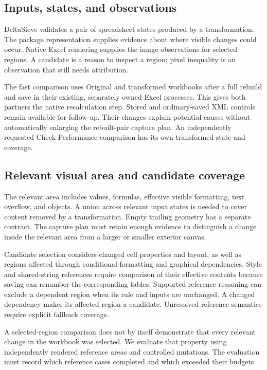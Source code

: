 \subsection{Inputs, states, and observations}
DeltaSieve validates a pair of spreadsheet states produced by a transformation.
The package representation supplies evidence about where visible changes could
occur. Native Excel rendering supplies the image observations for selected
regions. A candidate is a
reason to inspect a region; pixel inequality is an observation that still needs
attribution.

The fast comparison uses Original and transformed workbooks after a full rebuild
and save in their existing, separately owned Excel processes. This gives both
partners the native recalculation step. Stored and ordinary-saved XML controls
remain available for follow-up. Their changes explain potential causes without
automatically enlarging the rebuilt-pair capture plan. An independently requested
Check Performance comparison has its own transformed state and coverage.

\subsection{Relevant visual area and candidate coverage}
The relevant area includes values, formulas, effective visible formatting, text
overflow, and objects. A union across relevant input states is needed to cover
content removed by a transformation. Empty trailing geometry has a separate
contract. The capture plan must retain enough evidence to distinguish a change
inside the relevant area from a larger or smaller exterior canvas.

Candidate selection considers changed cell properties and layout, as well as
regions affected through conditional formatting and graphical dependencies.
Style and shared-string references require comparison of their effective
contents because saving can renumber the corresponding tables. Supported
reference reasoning can exclude a dependent region when its rule and inputs are
unchanged. A changed dependency makes its affected region a candidate. Unresolved
reference semantics require explicit fallback coverage.

A selected-region comparison does not by itself demonstrate that every relevant
change in the workbook was selected. We evaluate that property using independently
rendered reference areas and controlled mutations. The evaluation must record
which reference cases completed and which exceeded their budgets.


